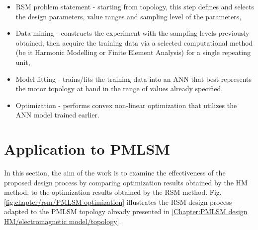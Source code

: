         
        \begin{itemize}
            \item RSM problem statement - starting from topology, this step defines and selects the design parameters, value ranges and sampling level of the parameters,
            \item Data mining - constructs the experiment with the sampling levels previously obtained, then acquire the training data via a selected computational method (be it Harmonic Modelling or Finite Element Analysis) for a single repeating unit,
            \item Model fitting - trains/fits the training data into an \ac{ANN} that best represents the motor topology at hand in the range of values already specified,
            \item Optimization - performs convex non-linear optimization that utilizes the \ac{ANN} model trained earlier.
        \end{itemize}
        

    \section{Application to PMLSM}             \label{Chapter:RSM/PMLSM}
    
        
        In this section, the aim of the work is to examine the effectiveness of the proposed design process by comparing optimization results obtained by the \acs{HM} method, to the optimization results obtained by the \acs{RSM} method. Fig.\,\ref{fig:chapter/rsm/PMLSM optimization} illustrates the \acs{RSM} design process adapted to the \acs{PMLSM} topology already presented in \ref{Chapter:PMLSM design HM/electromagnetic model/topology}. 
        
